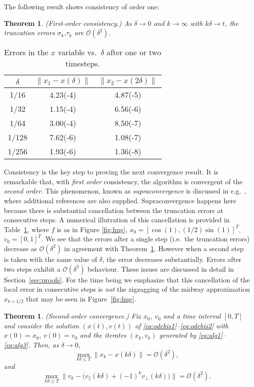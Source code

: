 \documentclass[10pt]{article}
\newcommand{\vperp}{v_\perp}
\newcommand{\vpar}{v_\|}
\newtheorem{theorem}[proposition]{Theorem}
\begin{document}
The following result shows consistency of order one:
\begin{theorem}\label{th:consistency}\emph{(First-order consistency.)}
As \(\delta\rightarrow 0\) and \(k\rightarrow \infty\) with \(k\delta \rightarrow t\), the truncation errors \(\sigma_k\),\(\tau_k\) are
\(\mathcal{O}(\delta^2)\).
\end{theorem}
%
\begin{table}
\begin{center}
\begin{tabular}{ccc}
\(\delta\) & \(\|x_1-x(\delta)\|\) & \(\|x_2-x(2\delta)\|\) \\
\hline
1/16 &4.23(-4)  & 4.87(-5)\\
1/32 & 1.15(-4) & 6.56(-6)\\
1/64 & 3.00(-4) & 8.50(-7)\\
1/128 &7.62(-6) & 1.08(-7)\\
1/256&1.93(-6)& 1.36(-8)
\end{tabular}
\end{center}
\caption{Errors in the \(x\) variable vs.\ \(\delta\) after one or two timesteps.}
\label{table:cancellation}
\end{table}
%
Consistency is the key step to proving the next convergence result. It is remarkable that, with \emph{first order} consistency, the algorithm is convergent of the \emph{second order}. This phenomenon, known as \emph{supraconvergence} is discussed  in e.g.\ \cite{GS91}, where additional references are also supplied. Supraconvergence happens here because there is substantial cancellation between  the truncation errors at consecutive steps. A numerical illutration of this cancellation is provided
in Table~\ref{table:cancellation}, where \(f\) is as in Figure \ref{fig:hug}, \(x_0 = [\cos(1), (1/2)\sin(1)]^T\), \(v_0= [0,1]^T\). We see that the errors after a single step (i.e.\ the truncation errors) decrease as \(\mathcal{O}(\delta^2)\) in agreement with Theorem~\ref{th:consistency}. However when a second step is taken with the same value of \(\delta\), the error decreases substantially. Errors after two steps exhibit a \(\mathcal{O}(\delta^3)\) behaviour. These issues are discussed in detail in Section~\ref{sec:proofs}. For the time being we emphasize that this cancellation of the local error in consecutive steps is \emph{not} the zigzagging of the midway approximation \(x_{k+1/2}\) that may be seen in Figure~\ref{fig:hug}.



\begin{theorem}\label{th:convergence} \emph{(Second-order convergence.)} Fix \(x_0\), \(v_0\) and a time interval \([0,T]\) and consider the solution \((x(t),v(t))\) of
\eqref{eq:odebis1}--\eqref{eq:odebis2} with \(x(0) = x_0\), \(v(0)=v_0\) and the iterates \((x_k,v_k)\) generated by \eqref{eq:alg1}--\eqref{eq:alg3}. Then, as \(\delta\rightarrow 0\),
\[
\max_{k\delta\leq T} \|x_{k}-x(k\delta)\| = \mathcal{O}(\delta^2),
\]
and
\[
\max_{k\delta\leq T} \|v_{k}-\big(\vpar(k\delta)+(-1)^k\vperp(k\delta)\big)\|  = \mathcal{O}(\delta^2).
\]
\end{theorem}
\end{document}
